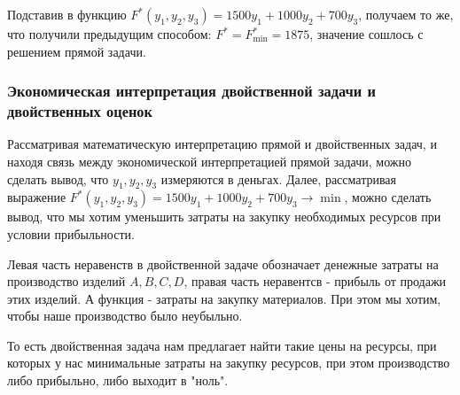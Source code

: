 Подставив в функцию $ F^{ *}(y_{ 1}, y_{ 2}, y_{ 3}) = 1500y_{ 1} + 1000y_{ 2} + 700y_{ 3} $, получаем то же, что получили предыдущим способом: $ F^{ *} = F_{ \min}^{ *} = 1875 $,
значение сошлось с решением прямой задачи.

\subsubsection{Экономическая интерпретация двойственной задачи и двойственных оценок}

Рассматривая математическую интерпретацию прямой и двойственных задач, и находя связь между экономической интерпретацией прямой задачи,
можно сделать вывод, что $ y_1, y_2, y_3 $ измеряются в деньгах. Далее, рассматривая выражение 
$ F^{ *}(y_{ 1}, y_{ 2}, y_{ 3}) = 1500y_{ 1} + 1000y_{ 2} + 700y_{ 3} \to \min$, можно сделать вывод, что
мы хотим уменьшить затраты на закупку необходимых ресурсов при условии прибыльности. 

Левая часть неравенств в двойственной задаче обозначает денежные затраты на производство изделий $ A, B, C, D $,
правая часть неравентсв - прибыль от продажи этих изделий. А функция - затраты на закупку материалов.
При этом мы хотим, чтобы наше производство было неубыльно.

То есть двойственная задача нам предлагает найти такие цены на ресурсы, при которых у нас минимальные затраты на закупку ресурсов, при
этом производство либо прибыльно, либо выходит в "ноль".
